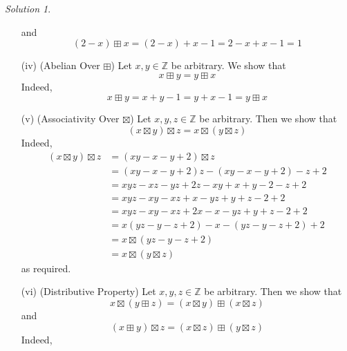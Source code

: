 \documentclass[11pt]{amsart}
\theoremstyle{definition}\newtheorem{question}{Question}
\theoremstyle{definition}\newtheorem{claim}{Claim}
\theoremstyle{remark}\newtheorem*{solution}{Solution}
\newcommand{\Z}{\mathbb{Z}}
\begin{document}
\begin{solution}
\begin{itemize}
        and
        \begin{equation*}
            (2 - x) \boxplus x = (2 - x) + x - 1 = 2 - x + x - 1 = 1
        \end{equation*}
        \item[(iv)] (Abelian Over $\boxplus$) Let $x, y \in \Z$ be arbitrary. We show that
        \begin{equation*}
            x \boxplus y = y \boxplus x
        \end{equation*}
        Indeed,
        \begin{equation*}
            x \boxplus y = x + y - 1 = y + x - 1 = y \boxplus x
        \end{equation*}
        \item[(v)] (Associativity Over $\boxtimes$) Let $x, y, z \in \Z$ be arbitrary. Then we show that
        \begin{equation*}
            (x \boxtimes y) \boxtimes z = x \boxtimes (y \boxtimes z)
        \end{equation*}
        Indeed,
        \begin{align*}
            (x \boxtimes y) \boxtimes z &= (xy - x - y + 2) \boxtimes z \\
            &= (xy - x - y + 2)z - (xy - x - y + 2) - z + 2 \\
            &= xyz - xz - yz + 2z - xy + x + y - 2 - z + 2 \\
            &= xyz - xy - xz + x - yz + y + z - 2 + 2 \\
            &= xyz - xy - xz + 2x - x - yz + y + z - 2 + 2 \\
            &= x(yz - y - z + 2) - x - (yz - y - z + 2) + 2 \\
            &= x \boxtimes (yz - y - z + 2) \\
            &= x \boxtimes (y \boxtimes z)
        \end{align*}
        as required.
        \item[(vi)] (Distributive Property) Let $x, y, z \in \Z$ be arbitrary. Then we show that
        \begin{equation*}
            x \boxtimes (y \boxplus z) = (x \boxtimes y) \boxplus (x \boxtimes z)
        \end{equation*}
        and
        \begin{equation*}
            (x \boxplus y) \boxtimes z = (x \boxtimes z) \boxplus (y \boxtimes z)
        \end{equation*}
        Indeed,
        \begin{align*}

\end{align*}
\end{itemize}
\end{solution}
\end{document}
